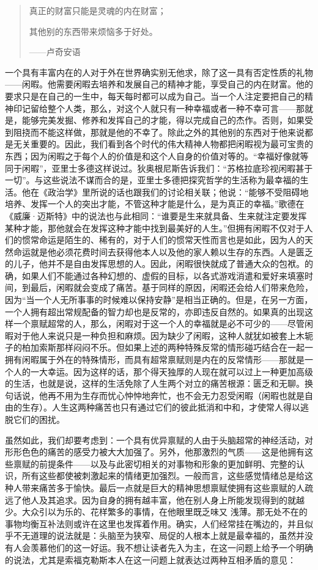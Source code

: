 \documentclass[12pt,oneside]{book}
\begin{document}
 
\begin{quotation}
真正的财富只能是灵魂的内在财富； 

其他别的东西带来烦恼多于好处。 

——卢奇安语 
\end{quotation}


一个具有丰富内在的人对于外在世界确实别无他求，除了这一具有否定性质的礼物——闲暇。他需要闲暇去培养和发展自己的精神才能，享受自己的内在财富。他的要求只是在自己的一生中，每天每时都可以成为自己。当一个人注定要把自己的精神印记留给整个人类，那么，对这个人就只有一种幸福或者一种不幸可言——那就是，能够完美发掘、修养和发挥自己的才能，得以完成自己的杰作。否则，如果受到阻挠而不能这样做，那就是他的不幸了。除此之外的其他别的东西对于他来说都是无关重要的。因此，我们看到各个时代的伟大精神人物都把闲暇视为最可宝贵的东西；因为闲暇之于每个人的价值是和这个人自身的价值对等的。“幸福好像就等同于闲暇”，亚里士多德这样说过。狄奥根尼斯告诉我们：“苏格拉底珍视闲暇甚于一切”。与这些说法不谋而合的是，亚里士多德把探究哲学的生活称为最幸福的生活。他在《政治学》里所说的话也跟我们的讨论相关联；他说：“能够不受阻碍地培养、发挥一个人的突出才能，不管这种才能是什么，是为真正的幸福。”歌德在《威廉·迈斯特》中的说法也与此相同：“谁要是生来就具备、生来就注定要发挥某种才能，那他就会在发挥这种才能中找到最美好的人生。”但拥有闲暇不仅对于人们的惯常命运是陌生的、稀有的，对于人们的惯常天性而言也是如此，因为人的天然命运就是他必须花费时间去获得他本人以及他的家人赖以生存的东西。人是匮乏的儿子，他并不是自由发挥思想的人。因此，闲暇很快就成了普通大众的包袱。的确，如果人们不能通过各种幻想的、虚假的目标，以各式游戏消遣和爱好来填塞时间，到最后，闲暇就会变成了痛苦。基于同样的原因，闲暇还会给人们带来危险，因为“当一个人无所事事的时候难以保持安静”是相当正确的。但是，在另一方面，一个人拥有超出常规配备的智力却也是反常的，亦即违反自然的。如果真的出现这样一个禀赋超常的人，那么，闲暇对于这一个人的幸福就是必不可少的——尽管闲暇对于他人来说只是一种负担和麻烦。因为缺少了闲暇，这种人就犹如被套上木轭子的柏加索斯那样闷闷不乐。但如果上述的两种特殊反常的情形碰巧结合在一起一拥有闲暇属于外在的特殊情形，而具有超常禀赋则是内在的反常情形——那就是一个人的一大幸运。因为这样的话，那个得天独厚的人现在就可以过上一种更加高级的生活，也就是说，这样的生活免除了人生两个对立的痛苦根源：匮乏和无聊。换句话说，他再不用为生存而忧心忡忡地奔忙，也不会无力忍受闲暇（闲暇也就是自由的生存）。人生这两种痛苦也只有通过它们的彼此抵消和中和，才使常人得以逃脱它们的困扰。 

虽然如此，我们却要考虑到：一个具有优异禀赋的人由于头脑超常的神经活动，对形形色色的痛苦的感受力被大大加强了。另外，他那激烈的气质——这是他拥有这些禀赋的前提条件——以及与此密切相关的对事物和形象的更加鲜明、完整的认识，所有这些都使被刺激起来的情绪更加强烈。一般而言，这些感觉情绪总是给这种人带来痛苦多于愉快。最后一点就是巨大的精神思想禀赋使拥有这些禀赋的人疏远了他人及其追求。因为自身的拥有越丰富，他在别人身上所能发现得到的就越少。大众引以为乐的、花样繁多的事情，在他眼里既乏味又
浅薄。那无处不在的事物均衡互补法则或许在这里也发挥着作用。确实，人们经常挂在嘴边的，并且似乎不无道理的说法就是：头脑至为狭窄、局促的人根本上就是最幸福的，虽然并没有人会羡慕他们的这一好运。我不想让读者先入为主，在这一问题上给予一个明确的说法，尤其是索福克勒斯本人在这一问题上就表达过两种互相矛盾的意见： 
\end{document}
